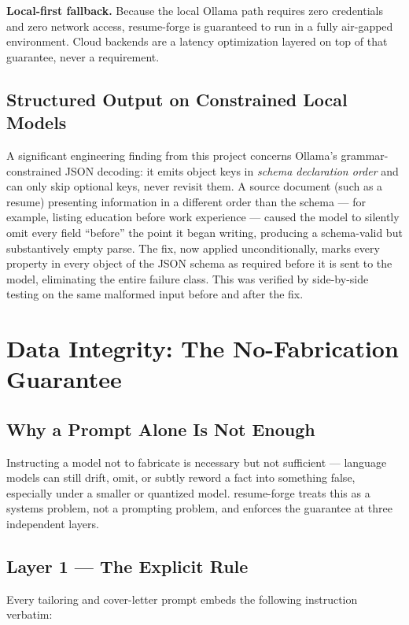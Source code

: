 \documentclass[10.5pt,letterpaper]{article}
\begin{document}
\begin{securitybox}
\textbf{Local-first fallback.} Because the local Ollama path requires zero credentials and
zero network access, resume-forge is guaranteed to run in a fully air-gapped environment.
Cloud backends are a latency optimization layered on top of that guarantee, never a
requirement.
\end{securitybox}

\subsection{Structured Output on Constrained Local Models}
A significant engineering finding from this project concerns Ollama's grammar-constrained
JSON decoding: it emits object keys in \emph{schema declaration order} and can only skip
optional keys, never revisit them. A source document (such as a resume) presenting
information in a different order than the schema --- for example, listing education before
work experience --- caused the model to silently omit every field ``before'' the point it
began writing, producing a schema-valid but substantively empty parse. The fix, now applied
unconditionally, marks every property in every object of the JSON schema as required before
it is sent to the model, eliminating the entire failure class. This was verified by
side-by-side testing on the same malformed input before and after the fix.

\newpage

\section{Data Integrity: The No-Fabrication Guarantee}

\subsection{Why a Prompt Alone Is Not Enough}
Instructing a model not to fabricate is necessary but not sufficient --- language models can
still drift, omit, or subtly reword a fact into something false, especially under a
smaller or quantized model. resume-forge treats this as a systems problem, not a prompting
problem, and enforces the guarantee at three independent layers.

\subsection{Layer 1 --- The Explicit Rule}
Every tailoring and cover-letter prompt embeds the following instruction verbatim:
\end{document}
